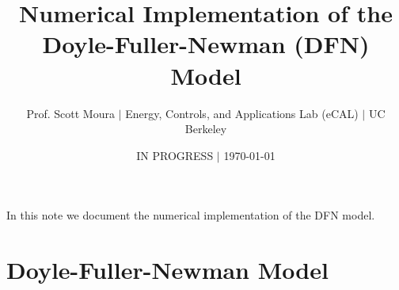 \documentclass[12pt]{article}
\title{Numerical Implementation of the Doyle-Fuller-Newman (DFN) Model}
\author{{\normalsize Prof. Scott Moura} $\mid$ {\normalsize Energy, Controls, and Applications Lab (eCAL) $\mid$ UC Berkeley}}
\date{{\normalsize IN PROGRESS $\mid$ \today}}                                           %
\begin{document}
\maketitle


In this note we document the numerical implementation of the DFN model.

\section{Doyle-Fuller-Newman Model}\label{sec:dfn}
\end{document}
